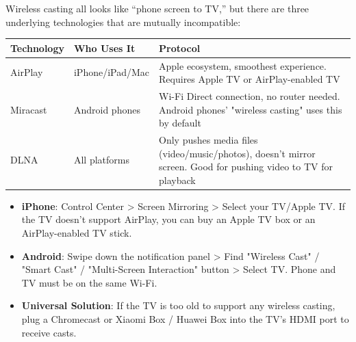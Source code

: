 


Wireless casting all looks like “phone screen to TV,” but there are three underlying technologies that are mutually incompatible:

\begin{center}
\begin{tabularx}{\linewidth}{|X|X|X|}
\hline
\textbf{Technology} & \textbf{Who Uses It} & \textbf{Protocol} \tabularnewline
\hline
AirPlay & iPhone/iPad/Mac & Apple ecosystem, smoothest experience. Requires Apple TV or AirPlay-enabled TV \tabularnewline
Miracast & Android phones & Wi-Fi Direct connection, no router needed. Android phones' "wireless casting" uses this by default \tabularnewline
DLNA & All platforms & Only pushes media files (video/music/photos), doesn't mirror screen. Good for pushing video to TV for playback \tabularnewline
\hline
\end{tabularx}
\end{center}


\begin{itemize}
  \item \textbf{iPhone}: Control Center > Screen Mirroring > Select your TV/Apple TV. If the TV doesn't support AirPlay, you can buy an Apple TV box or an AirPlay-enabled TV stick.
  \item \textbf{Android}: Swipe down the notification panel > Find "Wireless Cast" / "Smart Cast" / "Multi-Screen Interaction" button > Select TV. Phone and TV must be on the same Wi-Fi.
  \item \textbf{Universal Solution}: If the TV is too old to support any wireless casting, plug a Chromecast or Xiaomi Box / Huawei Box into the TV's HDMI port to receive casts.
\end{itemize}


